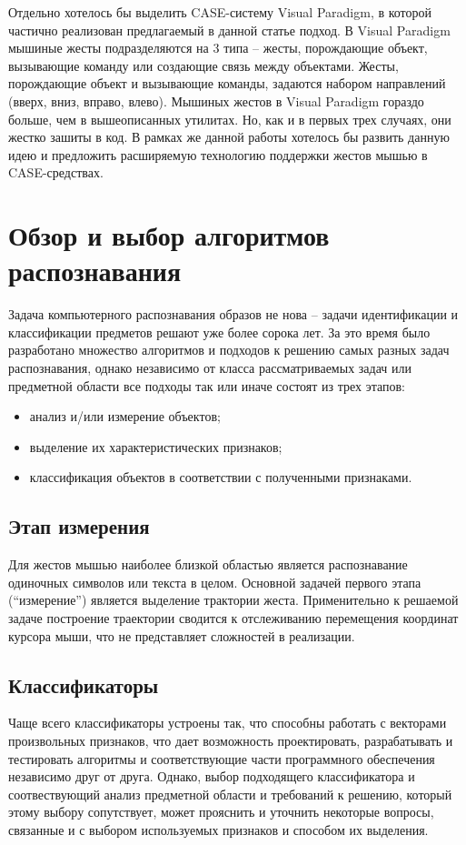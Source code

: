 \documentclass[a5paper]{article}
\begin{document}
Отдельно хотелось бы выделить CASE-систему Visual Paradigm, в которой частично реализован предлагаемый в данной статье подход. 
В Visual Paradigm мышиные жесты подразделяются на 3 типа -- жесты, порождающие объект, вызывающие команду или создающие связь
между объектами. Жесты, порождающие объект и вызывающие команды, задаются набором направлений (вверх, вниз, вправо, влево). 
Мышиных жестов в Visual Paradigm гораздо больше, чем в вышеописанных утилитах. Но, как и в первых трех случаях, они жестко
зашиты в код. В рамках же данной работы хотелось бы развить данную идею и предложить расширяемую технологию поддержки
жестов мышью в CASE-средствах.


\section{Обзор и выбор алгоритмов распознавания}
Задача компьютерного распознавания образов не нова -- задачи идентификации и классификации предметов решают уже более сорока лет. За это 
время было разработано множество алгоритмов и подходов к решению самых разных задач распознавания, однако независимо от класса 
рассматриваемых задач или предметной области все подходы так или иначе состоят из трех этапов: 
\begin{itemize}
  \item анализ и/или измерение объектов;
  \item выделение их характеристических признаков;
  \item классификация объектов в соответствии с полученными признаками.
\end{itemize}

\subsection{Этап измерения}
Для жестов мышью наиболее близкой областью является распознавание одиночных символов или текста в целом. Основной задачей первого этапа 
(``измерение'') является выделение трактории жеста. Применительно к решаемой задаче построение траектории сводится к отслеживанию 
перемещения координат курсора мыши, что не представляет сложностей в реализации. 

\subsection{Классификаторы}

Чаще всего классификаторы устроены так, что способны работать с векторами произвольных признаков, что дает возможность
проектировать, разрабатывать и тестировать алгоритмы и соответствующие части программного обеспечения независимо друг от друга. Однако, 
выбор подходящего классификатора и соотвествующий анализ предметной области и требований к решению, который этому выбору сопутствует, 
может прояснить и уточнить некоторые вопросы, связанные и с выбором используемых признаков и способом их выделения. 
\end{document}

